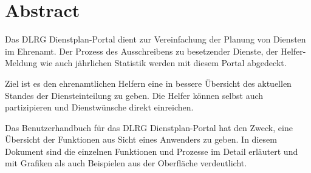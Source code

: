 \chapter*{Abstract} %

Das DLRG Dienstplan-Portal dient zur Vereinfachung der Planung von Diensten im Ehrenamt. Der Prozess des Ausschreibens zu besetzender Dienste, der Helfer-Meldung wie auch jährlichen Statistik werden mit diesem Portal abgedeckt.

\vspace*{5mm} \noindent Ziel ist es den ehrenamtlichen Helfern eine in bessere Übersicht des aktuellen Standes der Diensteinteilung zu geben. Die Helfer können selbst auch partizipieren und Dienstwünsche direkt einreichen. 

\vspace*{5mm} \noindent Das Benutzerhandbuch für das DLRG Dienstplan-Portal hat den Zweck, eine Übersicht der Funktionen aus Sicht eines Anwenders zu geben. In diesem Dokument sind die einzelnen Funktionen und Prozesse im Detail erläutert und mit Grafiken als auch Beispielen aus der Oberfläche verdeutlicht.